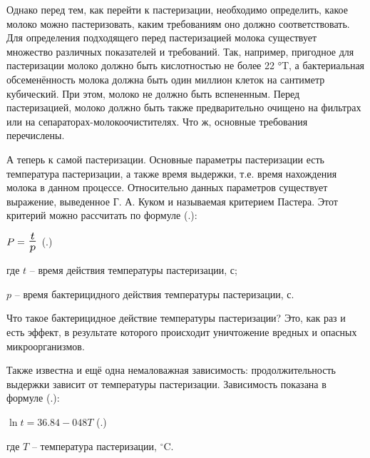 {  \par \redline Однако перед тем, как перейти к пастеризации, необходимо определить, какое молоко можно пастеризовать, каким требованиям оно должно соответствовать. Для определения подходящего перед пастеризацией молока существует множество различных показателей и требований. Так, например, пригодное для пастеризации молоко должно быть кислотностью не более 22 °T, а бактериальная обсеменённость молока должна быть один миллион клеток на сантиметр кубический. При этом, молоко не должно быть вспененным. Перед пастеризацией, молоко должно быть также предварительно очищено на фильтрах или на сепараторах-молокоочистителях. Что ж, основные требования перечислены.

  \par \redline А теперь к самой пастеризации. Основные параметры пастеризации есть температура пастеризации, а также время выдержки, т.е. время нахождения молока в данном процессе. Относительно данных параметров существует выражение, выведенное Г. А. Куком и называемая критерием Пастера. Этот критерий можно рассчитать по формуле (\thechaptercntr .\theformulacntr):

	\formulaspace \par \redline
    $P=\scaleto{\frac{t}{p}}{20pt}$
    \hfill (\thechaptercntr .\theformulacntr) \redline
	\formulaspace \addtocounter{formulacntr}{1}

  \par \redline где $t$ {--} время действия температуры пастеризации, с;

  \par \redline \wherespace $p$ {--} время бактерицидного действия температуры пастеризации, с.

  \par \redline Что такое бактерицидное действие температуры пастеризации? Это, как раз и есть эффект, в результате которого происходит уничтожение вредных и опасных микроорганизмов.

  \par \redline Также известна и ещё одна немаловажная зависимость: продолжительность выдержки зависит от температуры пастеризации. Зависимость показана в формуле (\thechaptercntr .\theformulacntr):

  \formulaspace
	\par \redline $\ln{t} = 36.84 - 048T$ \hfill (\thechaptercntr .\theformulacntr) \redline
	\formulaspace \addtocounter{formulacntr}{1}

  \par \redline где $T$ {--} температура пастеризации, $^{\circ}$C.

}
